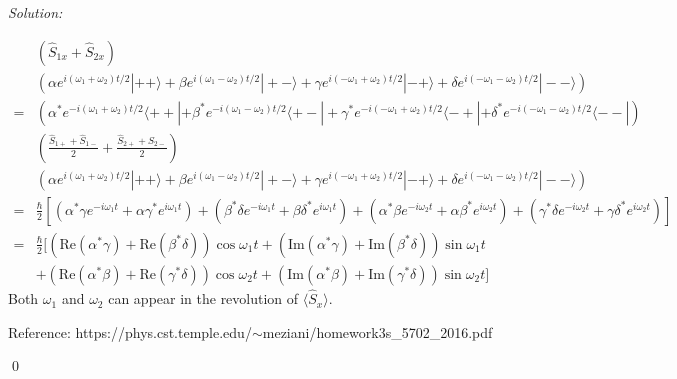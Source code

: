 \documentclass[10pt,a4paper]{article}
\newenvironment{sol}
    {\emph{Solution:}
    }
    {
    \qed
    }
\begin{document}
\begin{sol}
\begin{itemize}
\begin{align}
\nonumber&(\hat{S}_{1x}+\hat{S}_{2x})\\
\nonumber&(\alpha e^{i(\omega_1+\omega_2)t/2}|++\rangle+\beta e^{i(\omega_1-\omega_2)t/2}|+-\rangle+\gamma e^{i(-\omega_1+\omega_2)t/2}|-+\rangle+\delta e^{i(-\omega_1-\omega_2)t/2}|--\rangle)\\
\nonumber=&(\alpha^*e^{-i(\omega_1+\omega_2)t/2}\langle++|+\beta^*e^{-i(\omega_1-\omega_2)t/2}\langle+-|+\gamma^*e^{-i(-\omega_1+\omega_2)t/2}\langle-+|+\delta^*e^{-i(-\omega_1-\omega_2)t/2}\langle--|)\\
\nonumber&(\frac{\hat{S}_{1+}+\hat{S}_{1-}}{2}+\frac{\hat{S}_{2+}+\hat{S}_{2-}}{2})\\
\nonumber&(\alpha e^{i(\omega_1+\omega_2)t/2}|++\rangle+\beta e^{i(\omega_1-\omega_2)t/2}|+-\rangle+\gamma e^{i(-\omega_1+\omega_2)t/2}|-+\rangle+\delta e^{i(-\omega_1-\omega_2)t/2}|--\rangle)\\
\nonumber=&\frac{\hbar}{2}[(\alpha^*\gamma e^{-i\omega_1t}+\alpha\gamma^*e^{i\omega_1t})+(\beta^*\delta e^{-i\omega_1t}+\beta\delta^*e^{i\omega_1t})+(\alpha^*\beta e^{-i\omega_2t}+\alpha\beta^*e^{i\omega_2t})+(\gamma^*\delta e^{-i\omega_2t}+\gamma\delta^*e^{i\omega_2t})]\\
\nonumber=&\frac{\hbar}{2}[(\text{Re}(\alpha^*\gamma)+\text{Re}(\beta^*\delta))\cos\omega_1t+(\text{Im}(\alpha^*\gamma)+\text{Im}(\beta^*\delta))\sin\omega_1t\\
&+(\text{Re}(\alpha^*\beta)+\text{Re}(\gamma^*\delta))\cos\omega_2t+(\text{Im}(\alpha^*\beta)+\text{Im}(\gamma^*\delta))\sin\omega_2t]
\end{align}
Both $\omega_1$ and $\omega_2$ can appear in the revolution of $\langle\hat{S}_x\rangle$.
\end{itemize}
\small{Reference: https://phys.cst.temple.edu/$\sim$meziani/homework3s\_5702\_2016.pdf}
\end{sol}
\end{document}
